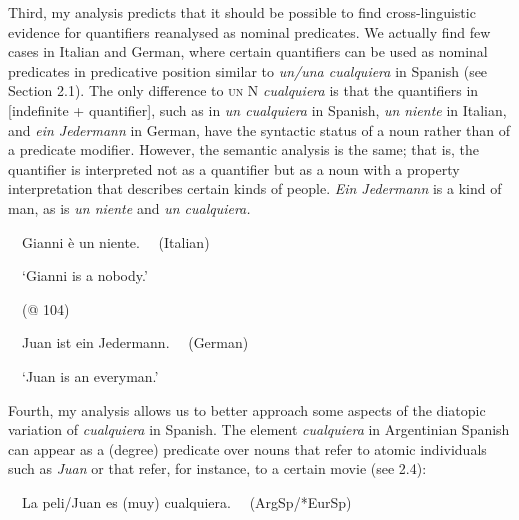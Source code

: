 \begin{styleStandard}
Third, my analysis predicts that it should be possible to find cross-linguistic evidence for quantifiers reanalysed as nominal predicates. We actually find few cases in Italian and German, where certain quantifiers can be used as nominal predicates in predicative position similar to \textit{un/una cualquiera} in Spanish (see Section 2.1). The only difference to \textsc{un} N \textit{cualquiera} is that the quantifiers in [indefinite + quantifier], such as in \textit{un cualquiera} in Spanish, \textit{un} \textit{niente} in Italian, and \textit{ein Jedermann} in German, have the syntactic status of a noun rather than of a predicate modifier. However, the semantic analysis is the same; that is, the quantifier is interpreted not as a quantifier but as a noun with a property interpretation that describes certain kinds of people. \textit{Ein Jedermann} is a kind of man, as is \textit{un niente} and \textit{un cualquiera.}
\end{styleStandard}

\begin{styleStandard}
\ \ Gianni è un niente. \ \ (Italian)
\end{styleStandard}

\begin{styleStandard}
\ \ ‘Gianni is a nobody.’
\end{styleStandard}

\begin{styleStandard}
\ \ (@ 104)
\end{styleStandard}

\begin{styleStandard}
\ \ Juan ist ein Jedermann. \ \ (German)
\end{styleStandard}

\begin{styleStandard}
\ \ ‘Juan is an everyman.’
\end{styleStandard}

\begin{styleStandard}
Fourth, my analysis allows us to better approach some aspects of the diatopic variation of \textit{cualquiera} in Spanish. The element \textit{cualquiera} in Argentinian Spanish can appear as a (degree) predicate over nouns that refer to atomic individuals such as \textit{Juan} or that refer, for instance, to a certain movie (see 2.4):
\end{styleStandard}

\begin{styleStandard}
\ \ La peli/Juan es (muy) cualquiera. \ \ (ArgSp/*EurSp)
\end{styleStandard}

